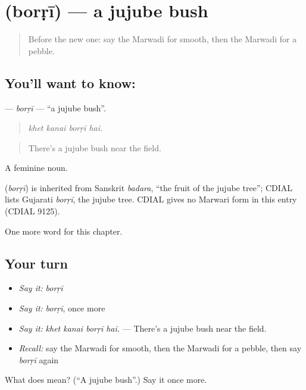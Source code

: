 \section[\texorpdfstring{\mw{बोरड़ी} (borṛī)}{बोरड़ी (borṛī)}]{ (borṛī) — a jujube bush}

\label{lesson:MW-C232-borri}



\begin{quote}
Before the new one: say the Marwadi for smooth, then the Marwadi for a pebble.
\end{quote}

\subsection*{You'll want to know: }
\textbf{} — \emph{borṛī} — \textquotedblleft{}a jujube bush\textquotedblright{}.

\begin{quote}
   
\end{quote}

\begin{quote}
\emph{khet kanai borṛī hai.}
\end{quote}

\begin{quote}
There's a jujube bush near the field.
\end{quote}

A feminine noun.

\begin{cousinweb}
\textbf{} (\emph{borṛī}) is inherited from Sanskrit \emph{badara}, \textquotedblleft{}the fruit of the jujube tree\textquotedblright{}; CDIAL lists Gujarati \emph{borṛī}, the jujube tree. CDIAL gives no Marwari form in this entry (CDIAL 9125).
\end{cousinweb}

\begin{grammarlens}[title={What you've built}]
One more word for this chapter.
\end{grammarlens}

\subsection*{Your turn}
\begin{itemize}
\raggedright
  \item \emph{Say it:} \emph{borṛī}
  \item \emph{Say it:} \emph{borṛī}, once more
  \item \emph{Say it:} \emph{khet kanai borṛī hai.} — There's a jujube bush near the field.
  \item \emph{Recall:} say the Marwadi for smooth, then the Marwadi for a pebble, then say \emph{borṛī} again
\end{itemize}

\begin{tcolorbox}[breakable,colback=teal!4,colframe=teal!35!black,title={Before you move on}]
What does  mean? (\textquotedblleft{}A jujube bush\textquotedblright{}.) Say it once more.
\end{tcolorbox}

